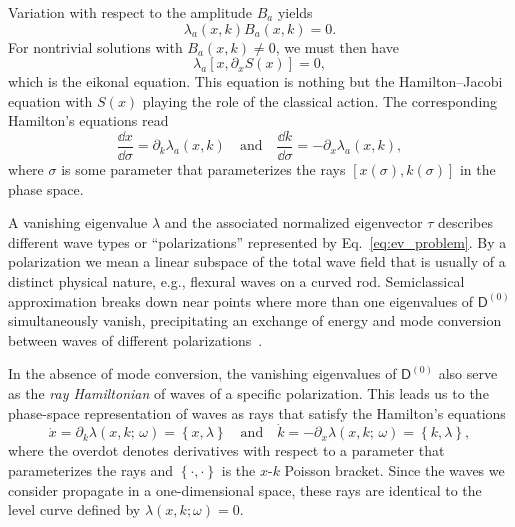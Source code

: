 Variation with respect to the amplitude $B_{a}$ yields
%
\begin{equation}
  \lambda_{a}(x, k) B_{a}(x, k) = 0.
\end{equation}
%
For nontrivial solutions with $B_{a}(x, k) \neq 0$, we must then have
%
\begin{equation}
  \lambda_{a}\left[x, \partial_{x}S(x)\right] = 0,
\end{equation}
%
which is the eikonal equation.
This equation is nothing but the Hamilton--Jacobi equation with $S(x)$ playing the role of the classical action.
The corresponding Hamilton's equations read
%
\begin{equation}
  \frac{\dd{x}}{\dd{\sigma}} = \partial_{k}\lambda_{a}(x, k)
  \quad\text{and}\quad
  \frac{\dd{k}}{\dd{\sigma}} = -\partial_{x}\lambda_{a}(x, k),
\end{equation}
%
where $\sigma$ is some parameter that parameterizes the rays $[x(\sigma), k(\sigma)]$ in the phase space.

A vanishing eigenvalue $\lambda$ and the associated normalized eigenvector $\tau$ describes different wave types or ``polarizations'' represented by Eq.~\eqref{eq:ev_problem}.
By a polarization we mean a linear subspace of the total wave field that is usually of a distinct physical nature, e.g., flexural waves on a curved rod.
Semiclassical approximation breaks down near points where more than one eigenvalues of $\mathsf{D}^{(0)}$ simultaneously vanish, precipitating an exchange of energy and mode conversion between waves of different polarizations~\cite{tracy2014}.

In the absence of mode conversion, the vanishing eigenvalues of $\mathsf{D}^{(0)}$ also serve as the \emph{ray Hamiltonian} of waves of a specific polarization.
 This leads us to the phase-space representation of waves as rays that satisfy the Hamilton's equations
%
\begin{equation}
  \dot{x} = \partial_{k} \lambda(x, k;\, \omega) = \left\{x, \lambda\right\}
  \quad\text{and}\quad
  \dot{k} = -\partial_{x} \lambda(x, k;\, \omega) = \left\{k, \lambda\right\},
\end{equation}
%
where the overdot denotes derivatives with respect to a parameter that parameterizes the rays and $\left\{\cdot, \cdot\right\}$ is the $x$-$k$ Poisson bracket.
Since the waves we consider propagate in a one-dimensional space, these rays are identical to the level curve defined by $\lambda(x, k; \omega) = 0$.

